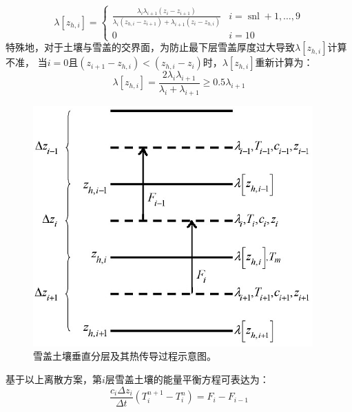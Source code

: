 \begin{equation}
\lambda\left[z_{h, i}\right]=\left\{\begin{array}{cc}\frac{\lambda_{i} \lambda_{i+1}\left(z_{i}-z_{i+1}\right)}{\lambda_{i}\left(z_{h, i}-z_{i+1}\right)+\lambda_{i+1}\left(z_{i}-z_{h, i}\right)} & i=\operatorname{snl}+1, \ldots, 9 \\ 0 & i=10\end{array}\right.
\end{equation}
特殊地，对于土壤与雪盖的交界面，为防止最下层雪盖厚度过大导致$\lambda\left[z_{h,i}\right]$计算不准，
当$i=0$且$\left(z_{i+1}-z_{h,i}\right)<\left(z_{h,i}-z_i\right)$时，$\lambda\left[z_{h,i}\right]$重新计算为：
\begin{equation}
\lambda\left[z_{h,i}\right]=\frac{2 \lambda_{i} \lambda_{i+1}}{\lambda_{i}+\lambda_{i+1}} \geq 0.5 \lambda_{i+1}
\end{equation}
{
\begin{figure}[]
\centering
\includegraphics{Figures/雪盖土壤热力过程/雪盖土壤垂直分层及其热传导过程示意图.png}
\caption{雪盖土壤垂直分层及其热传导过程示意图。}
\label{fig:雪盖土壤垂直分层及其热传导过程示意图}
\end{figure}
}


基于以上离散方案，第$ i $层雪盖土壤的能量平衡方程可表达为：
\begin{equation}
\frac{c_{i} \Delta z_{i}}{\Delta t}\left(T_{i}^{n+1}-T_{i}^{n}\right)=F_{i}-F_{i-1}
\end{equation}

